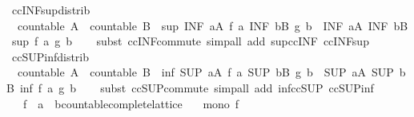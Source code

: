 \begin{isabellebody}
\endisatagproof
{\isafoldproof}%
%
\isadelimproof
\isanewline
%
\endisadelimproof
\isanewline
{}\isamarkupfalse%
\ ccINF{\isacharunderscore}sup{\isacharunderscore}distrib{}{\isacharcolon}\isanewline
\ \ {\isachardoublequoteopen}countable\ A\ {\isasymLongrightarrow}\ countable\ B\ {\isasymLongrightarrow}\ sup\ {\isacharparenleft}INF\ a{\isacharcolon}A{\isachardot}\ f\ a{\isacharparenright}\ {\isacharparenleft}INF\ b{\isacharcolon}B{\isachardot}\ g\ b{\isacharparenright}\ {\isacharequal}\ {\isacharparenleft}INF\ a{\isacharcolon}A{\isachardot}\ INF\ b{\isacharcolon}B{\isachardot}\ sup\ {\isacharparenleft}f\ a{\isacharparenright}\ {\isacharparenleft}g\ b{\isacharparenright}{\isacharparenright}{\isachardoublequoteclose}\isanewline
%
\isadelimproof
\ \ %
\endisadelimproof
%
\isatagproof
{}\isamarkupfalse%
\ {\isacharparenleft}subst\ ccINF{\isacharunderscore}commute{\isacharparenright}\ {\isacharparenleft}simp{\isacharunderscore}all\ add{\isacharcolon}\ sup{\isacharunderscore}ccINF\ ccINF{\isacharunderscore}sup{\isacharparenright}%
\endisatagproof
{\isafoldproof}%
%
\isadelimproof
\isanewline
%
\endisadelimproof
\isanewline
{}\isamarkupfalse%
\ ccSUP{\isacharunderscore}inf{\isacharunderscore}distrib{}{\isacharcolon}\isanewline
\ \ {\isachardoublequoteopen}countable\ A\ {\isasymLongrightarrow}\ countable\ B\ {\isasymLongrightarrow}\ inf\ {\isacharparenleft}SUP\ a{\isacharcolon}A{\isachardot}\ f\ a{\isacharparenright}\ {\isacharparenleft}SUP\ b{\isacharcolon}B{\isachardot}\ g\ b{\isacharparenright}\ {\isacharequal}\ {\isacharparenleft}SUP\ a{\isacharcolon}A{\isachardot}\ SUP\ b{\isacharcolon}B{\isachardot}\ inf\ {\isacharparenleft}f\ a{\isacharparenright}\ {\isacharparenleft}g\ b{\isacharparenright}{\isacharparenright}{\isachardoublequoteclose}\isanewline
%
\isadelimproof
\ \ %
\endisadelimproof
%
\isatagproof
{}\isamarkupfalse%
\ {\isacharparenleft}subst\ ccSUP{\isacharunderscore}commute{\isacharparenright}\ {\isacharparenleft}simp{\isacharunderscore}all\ add{\isacharcolon}\ inf{\isacharunderscore}ccSUP\ ccSUP{\isacharunderscore}inf{\isacharparenright}%
\endisatagproof
{\isafoldproof}%
%
\isadelimproof
\isanewline
%
\endisadelimproof
\isanewline
{}\isamarkupfalse%
\isanewline
\ \ \ f\ {\isacharcolon}{\isacharcolon}\ {\isachardoublequoteopen}{\isacharprime}a\ {\isasymRightarrow}\ {\isacharprime}b{\isacharcolon}{\isacharcolon}countable{\isacharunderscore}complete{\isacharunderscore}lattice{\isachardoublequoteclose}\isanewline
\ \ \ {\isachardoublequoteopen}mono\ f{\isachardoublequoteclose}\isanewline

\end{isabellebody}
